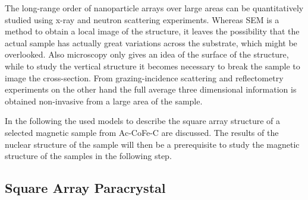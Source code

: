 \documentclass[\main/dresen_thesis.tex]{subfiles}
\renewcommand{\thisPath}{\main/chapters/monolayers/paracrystal}
\begin{document}
  The long-range order of nanoparticle arrays over large areas can be quantitatively studied using x-ray and neutron scattering experiments.
  Whereas SEM is a method to obtain a local image of the structure, it leaves the possibility that the actual sample has actually great variations across the substrate, which might be overlooked.
  Also microscopy only gives an idea of the surface of the structure, while to study the vertical structure it becomes necessary to break the sample to image the cross-section.
  From grazing-incidence scattering and reflectometry experiments on the other hand the full average three dimensional information is obtained non-invasive from a large area of the sample.

  In the following the used models to describe the square array structure of a selected magnetic sample from Ac-CoFe-C are discussed.
  The results of the nuclear structure of the sample will then be a prerequisite to study the magnetic structure of the samples in the following step.

  \subsection{Square Array Paracrystal}
    
\end{document}
